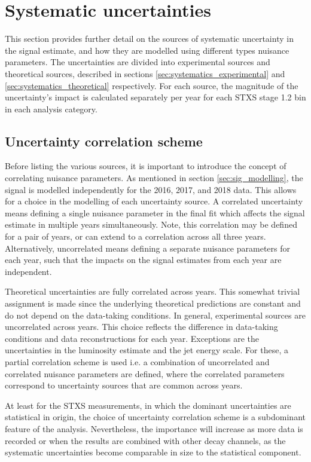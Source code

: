 \section{Systematic uncertainties}\label{sec:systematics}
This section provides further detail on the sources of systematic uncertainty in the signal estimate, and how they are modelled using different types nuisance parameters. The uncertainties are divided into experimental sources and theoretical sources, described in sections \ref{sec:systematics_experimental} and \ref{sec:systematics_theoretical} respectively. For each source, the magnitude of the uncertainty's impact is calculated separately per year for each STXS stage 1.2 bin in each analysis category.

\subsection{Uncertainty correlation scheme}
Before listing the various sources, it is important to introduce the concept of correlating nuisance parameters. As mentioned in section \ref{sec:sig_modelling}, the signal is modelled independently for the 2016, 2017, and 2018 data. This allows for a choice in the modelling of each uncertainty source. A correlated uncertainty means defining a single nuisance parameter in the final fit which affects the signal estimate in multiple years simultaneously. Note, this correlation may be defined for a pair of years, or can extend to a correlation across all three years. Alternatively, uncorrelated means defining a separate nuisance parameters for each year, such that the impacts on the signal estimates from each year are independent. 

Theoretical uncertainties are fully correlated across years. This somewhat trivial assignment is made since the underlying theoretical predictions are constant and do not depend on the data-taking conditions. In general, experimental sources are uncorrelated across years. This choice reflects the difference in data-taking conditions and data reconstructions for each year. Exceptions are the uncertainties in the luminosity estimate and the jet energy scale. For these, a partial correlation scheme is used i.e. a combination of uncorrelated and correlated nuisance parameters are defined, where the correlated parameters correspond to uncertainty sources that are common across years.

At least for the STXS measurements, in which the dominant uncertainties are statistical in origin, the choice of uncertainty correlation scheme is a subdominant feature of the analysis. Nevertheless, the importance will increase as more data is recorded or when the results are combined with other decay channels, as the systematic uncertainties become comparable in size to the statistical component.

